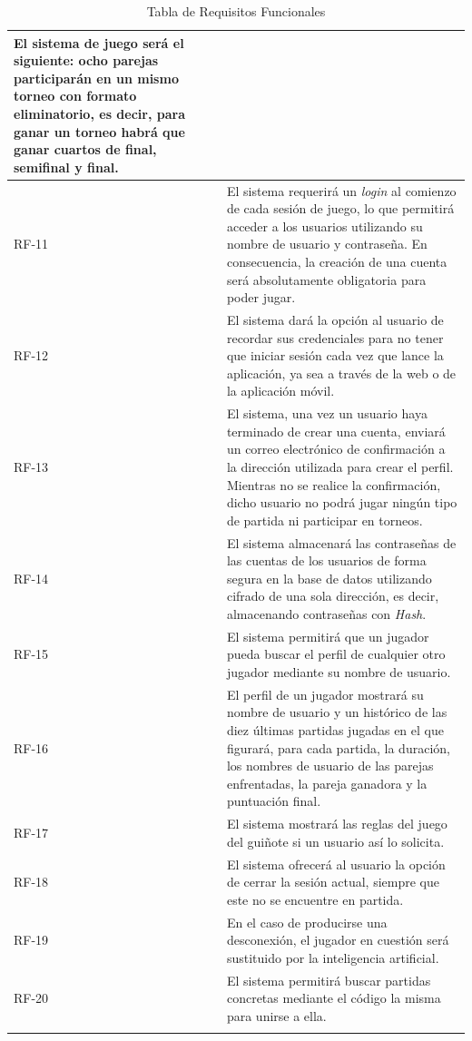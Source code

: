 \documentclass{article}
\begin{document}
\begin{center}
\begin{longtable}{ | p{} | p{} | }
        El sistema de juego será el siguiente: ocho parejas participarán en un mismo torneo con formato eliminatorio, es decir, para ganar un torneo habrá que ganar cuartos de final, semifinal y final. \\
        \hline
        RF-11 & El sistema requerirá un \textit{login} al comienzo de cada sesión de juego, lo que permitirá acceder a los usuarios utilizando su nombre de usuario y contraseña. En consecuencia, la creación de una cuenta será absolutamente obligatoria para poder jugar. \\
        \hline
        RF-12 & El sistema dará la opción al usuario de recordar sus credenciales para no tener que iniciar sesión cada vez que lance la aplicación, ya sea a través de la web o de la aplicación móvil. \\
        \hline
        RF-13 & El sistema, una vez un usuario haya terminado de crear una cuenta, enviará un correo electrónico de confirmación a la dirección utilizada para crear el perfil. Mientras no se realice la confirmación, dicho usuario no podrá jugar ningún tipo de partida ni participar en torneos. \\
        \hline
        RF-14 & El sistema almacenará las contraseñas de las cuentas de los usuarios de forma segura en la base de datos utilizando cifrado de una sola dirección, es decir, almacenando contraseñas con \textit{Hash}. \\
        \hline
        RF-15 & El sistema permitirá que un jugador pueda buscar el perfil de cualquier otro jugador mediante su nombre de usuario. \\
        \hline
        RF-16 & El perfil de un jugador mostrará su nombre de usuario y un histórico de las diez últimas partidas jugadas en el que figurará, para cada partida, la duración, los nombres de usuario de las parejas enfrentadas, la pareja ganadora y la puntuación final. \\
        \hline
        RF-17 & El sistema mostrará las reglas del juego del guiñote si un usuario así lo solicita. \\
        \hline
        RF-18 & El sistema ofrecerá al usuario la opción de cerrar la sesión actual, siempre que este no se encuentre en partida. \\
        \hline
        RF-19 & En el caso de producirse una desconexión, el jugador en cuestión será sustituido por la inteligencia artificial. \\
        \hline
        RF-20 & El sistema permitirá buscar partidas concretas mediante el código la misma para unirse a ella. \\
        \hline
        \caption{Tabla de Requisitos Funcionales}
    \end{longtable}
\end{center}
\end{document}
